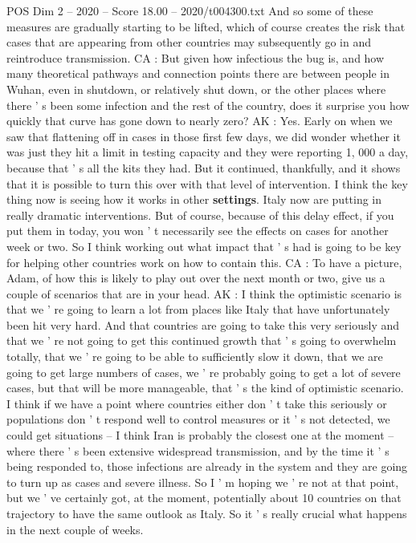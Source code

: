 \begin{textsample}{POS Dim 2 – 2020 – Score 18.00 – 2020/t004300.txt}
And so some of these measures are gradually starting to be lifted, which of course creates the risk that cases that are appearing from other countries may subsequently go in and reintroduce transmission.
CA : But given how infectious the bug is, and how many theoretical pathways and connection points there are between people in Wuhan, even in shutdown, or relatively shut down, or the other places where there ' s been some infection and the rest of the country, does it surprise you how quickly that curve has gone down to nearly zero?
AK : Yes.
Early on when we saw that flattening off in cases in those first few days, we did wonder whether it was just they hit a limit in testing capacity and they were reporting 1, 000 a day, because that ' s all the kits they had.
But it continued, thankfully, and it shows that it is possible to turn this over with that level of intervention.
I think the key thing now is seeing how it works in other \textbf{settings}.
Italy now are putting in really dramatic interventions.
But of course, because of this delay effect, if you put them in today, you won ' t necessarily see the effects on cases for another week or two.
So I think working out what impact that ' s had is going to be key for helping other countries work on how to contain this.
CA : To have a picture, Adam, of how this is likely to play out over the next month or two, give us a couple of scenarios that are in your head.
AK : I think the optimistic scenario is that we ' re going to learn a lot from places like Italy that have unfortunately been hit very hard.
And that countries are going to take this very seriously and that we ' re not going to get this continued growth that ' s going to overwhelm totally, that we ' re going to be able to sufficiently slow it down, that we are going to get large numbers of cases, we ' re probably going to get a lot of severe cases, but that will be more manageable, that ' s the kind of optimistic scenario.
I think if we have a point where countries either don ' t take this seriously or populations don ' t respond well to control measures or it ' s not detected, we could get situations -- I think Iran is probably the closest one at the moment -- where there ' s been extensive widespread transmission, and by the time it ' s being responded to, those infections are already in the system and they are going to turn up as cases and severe illness.
So I ' m hoping we ' re not at that point, but we ' ve certainly got, at the moment, potentially about 10 countries on that trajectory to have the same outlook as Italy.
So it ' s really crucial what happens in the next couple of weeks.

\end{textsample}
